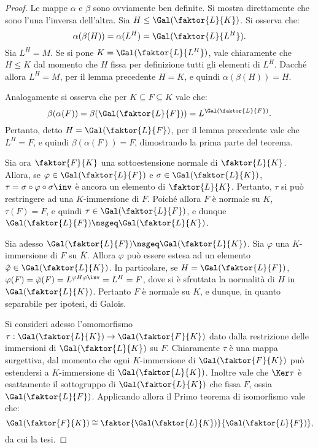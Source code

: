 \documentclass[12pt]{scrartcl}
\begin{document}
	\begin{proof}
		Le mappe $\alpha$ e $\beta$ sono ovviamente ben definite. Si mostra direttamente che sono l'una
		l'inversa dell'altra. Sia $H \leq \Gal(\faktor{L}{K})$.
		Si osserva che:
		\[ \alpha(\beta(H)) = \alpha(L^H) = \Gal(\faktor{L}{L^H}). \]
		Sia $L^H = M$. Se si pone $K = \Gal(\faktor{L}{L^H})$, vale chiaramente che $H \leq K$ dal momento che $H$
		fissa per definizione tutti gli elementi di 
		$L^H$. Dacché allora $L^H = M$, per il lemma precedente
		$H = K$, e quindi $\alpha(\beta(H)) = H$. \medskip
		
		
		Analogamente si osserva che per $K \subseteq F \subseteq K$ vale che:
		\[ \beta(\alpha(F)) = \beta(\Gal(\faktor{L}{F})) =
			L^{\Gal(\faktor{L}{F})}. \]
		Pertanto, detto $H = \Gal(\faktor{L}{F})$,
		per il lemma precedente vale che $L^H = F$,
		e quindi $\beta(\alpha(F)) = F$, dimostrando
		la prima parte del teorema. \medskip
		
		
		Sia ora $\faktor{F}{K}$ una sottoestensione normale
		di $\faktor{L}{K}$. Allora, se $\varphi \in \Gal(\faktor{L}{F})$ e $\sigma \in \Gal(\faktor{L}{K})$,
		$\tau = \sigma \circ \varphi \circ \sigma\inv$ è ancora
		un elemento di $\faktor{L}{K}$. Pertanto,
		$\tau$ si può restringere ad una $K$-immersione di $F$.
		Poiché allora $F$ è normale su $K$, $\tau(F) = F$, e
		quindi $\tau \in \Gal(\faktor{L}{F})$, e dunque
		$\Gal(\faktor{L}{F}) \nsgeq \Gal(\faktor{L}{K})$. \medskip
		
		
		Sia adesso $\Gal(\faktor{L}{F}) \nsgeq \Gal(\faktor{L}{K})$. Sia $\varphi$ una $K$-immersione
		di $F$ su $\overline{K}$. Allora $\varphi$ può essere
		estesa ad un elemento $\tilde{\varphi} \in \Gal(\faktor{L}{K})$. In particolare,
		se $H = \Gal(\faktor{L}{F})$, $\varphi(F) =
		\tilde{\varphi}(F) = L^{\varphi H \varphi\inv} = L^H = F$, dove si è sfruttata la normalità di $H$ in
		$\Gal(\faktor{L}{K})$. Pertanto $F$ è normale su $K$,
		e dunque, in quanto separabile per ipotesi, di Galois. \medskip
		
		
		Si consideri adesso l'omomorfismo $\tau : \Gal(\faktor{L}{K}) \to \Gal(\faktor{F}{K})$ dato
		dalla restrizione delle immersioni di $\Gal(\faktor{L}{K})$ su $F$. Chiaramente $\tau$
		è una mappa surgettiva, dal momento che ogni $K$-immersione di $\Gal(\faktor{F}{K})$ può estendersi
		a $K$-immersione di $\Gal(\faktor{L}{K})$. Inoltre
		vale che $\Ker \tau$ è esattamente il sottogruppo
		di $\Gal(\faktor{L}{K})$ che fissa $F$, ossia
		$\Gal(\faktor{L}{F})$. Applicando allora il Primo
		teorema di isomorfismo vale che:
		\[ \Gal(\faktor{F}{K}) \cong \faktor{\Gal(\faktor{L}{K})}{\Gal(\faktor{L}{F})}, \]
		da cui la tesi.
	\end{proof}
\end{document}
